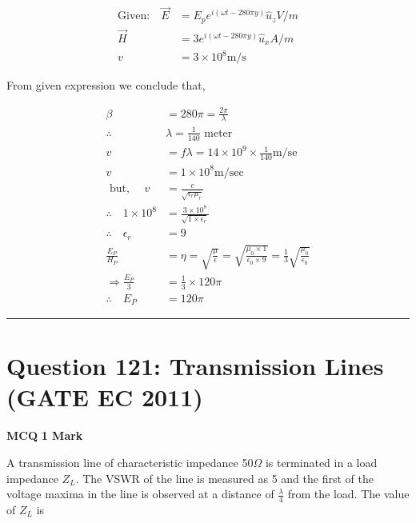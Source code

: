\documentclass[11pt,a4paper]{article}
\begin{document}
\begin{tcolorbox}[solbox, title=Detailed Solution -- Question 120]
\[
\begin{aligned} \text{Given:}\quad\vec{E}&=E_{p} e^{i(\omega t-280 \pi y)} \hat{u}_{z} V / m\\ \vec{H}&=3 e^{i(\omega t-280 \pi y)} \hat{u}_{x} A / m \\ v&=3 \times 10^{8} \mathrm{m} / \mathrm{s} \end{aligned}
\]

 From given expression we conclude that,

\[
\begin{aligned} \beta &=280 \pi=\frac{2 \pi}{\lambda} \\ \therefore \quad & \lambda=\frac{1}{140} \text { meter } \\ v &=f \lambda=14 \times 10^{9} \times \frac{1}{140} \mathrm{m} / \mathrm{se} \\ v &=1 \times 10^{8} \mathrm{m} / \mathrm{sec} \\ \text { but, } \quad v &=\frac{c}{\sqrt{\epsilon_{r} \mu_{r}}} \\ \therefore \quad 1 \times 10^{8} &=\frac{3 \times 10^{8}}{\sqrt{1 \times \epsilon_{r}}} \\ \therefore \quad \epsilon_{r}&=9\\ \frac{E_{P}}{H_{P}}&=\eta=\sqrt{\frac{\mu}{\epsilon}}=\sqrt{\frac{\mu_{0} \times 1}{\epsilon_{0} \times 9}}=\frac{1}{3} \sqrt{\frac{\mu_{0}}{\epsilon_{0}}} \\ \Rightarrow \frac{E_{P}}{3}&=\frac{1}{3} \times 120 \pi \\ \therefore \quad E_{P}&=120 \pi \end{aligned}
\]
\end{tcolorbox}

\vspace{1.5em}
\hrule
\vspace{1.5em}

\section*{Question 121: Transmission Lines (GATE EC 2011)}
\noindent \textbf{\color{primary}MCQ} \hfill \textbf{\color{secondary}1 Mark}


\noindent A transmission line of characteristic impedance 50$\Omega$ is terminated in a load
impedance $Z_{L}$. The VSWR of the line is measured as 5 and the first of the
voltage maxima in the line is observed at a distance of $\frac{\lambda }{4}$ from the load. The value of $Z_{L}$ is
\end{document}
